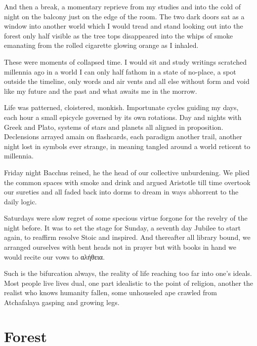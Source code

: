 \documentclass[ebook, 10pt, openright, onecolumn]{memoir}
\newcommand{\textgreek}[1]{\begingroup\fontencoding{LGR}\selectfont#1\endgroup}
\begin{document}
And then a break, a momentary reprieve from my studies and into the cold of
night on the balcony just on the edge of the room.  The two dark doors sat as a
window into another world which I would tread and stand looking out into the
forest only half visible as the tree tops disappeared into the whips of smoke
emanating from the rolled cigarette glowing orange as I inhaled.

These were moments of collapsed time.  I would sit and study writings scratched
millennia ago in a world I can only half fathom in a state of no-place, a spot
outside the timeline, only words and air vents and all else without form and
void like my future and the past and what awaits me in the morrow.

Life was patterned, cloistered, monkish.  Importunate cycles guiding my days,
each hour a small epicycle governed by its own rotations.  Day and nights with
Greek and Plato, systems of stars and planets all aligned in proposition.
Declensions arrayed amain on flashcards, each paradigm another trail, another
night lost in symbols ever strange, in meaning tangled around a world reticent
to millennia. 

Friday night Bacchus reined, he the head of our collective unburdening.  We
plied the common spaces with smoke and drink and argued Aristotle till time
overtook our sureties and all faded back into dorms to dream in ways abhorrent
to the daily logic.

Saturdays were slow regret of some specious virtue forgone for the revelry of
the night before.  It was to set the stage for Sunday, a seventh day Jubilee to
start again, to reaffirm resolve Stoic and inspired.  And thereafter all library
bound, we arranged ourselves with bent heads not in prayer but with books in
hand we would recite our vows to \textgreek{αλήθεια}.

Such is the bifurcation always, the reality of life reaching too far into one's
ideals.  Most people live lives dual, one part idealistic to the point of
religion, another the realist who knows humanity fallen, some unhouseled ape
crawled from Atchafalaya gasping and growing legs.

\chapter{Forest}
\label{cha:forest}
\end{document}
